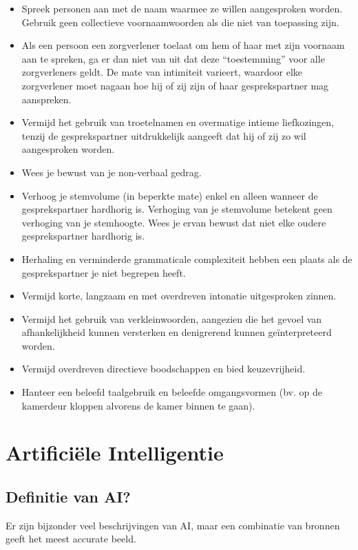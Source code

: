 \begin{itemize}
    \item Spreek personen aan met de naam waarmee ze willen aangesproken worden. Gebruik geen collectieve voornaamwoorden als die niet van toepassing zijn.
    \item Als een persoon een zorgverlener toelaat om hem of haar met zijn voornaam aan te spreken, ga er dan niet van uit dat deze “toestemming” voor alle zorgverleners geldt. De mate van intimiteit varieert, waardoor elke zorgverlener moet nagaan hoe hij of zij zijn of haar gesprekspartner mag aanspreken.
    \item Vermijd het gebruik van troetelnamen en overmatige intieme liefkozingen, tenzij de gesprekspartner uitdrukkelijk aangeeft dat hij of zij zo wil aangesproken worden.
    \item Wees je bewust van je non-verbaal gedrag.
    \item Verhoog je stemvolume (in beperkte mate) enkel en alleen wanneer de gesprekspartner hardhorig is. Verhoging van je stemvolume betekent geen verhoging van je stemhoogte. Wees je ervan bewust dat niet elke oudere gesprekspartner hardhorig is.
    \item Herhaling en verminderde grammaticale complexiteit hebben een plaats als de gesprekspartner je niet begrepen heeft.
    \item Vermijd korte, langzaam en met overdreven intonatie uitgesproken zinnen.
    \item Vermijd het gebruik van verkleinwoorden, aangezien die het gevoel van afhankelijkheid kunnen versterken en denigrerend kunnen geïnterpreteerd worden.
    \item Vermijd overdreven directieve boodschappen en bied keuzevrijheid.
    \item Hanteer een beleefd taalgebruik en beleefde omgangsvormen (bv. op de kamerdeur kloppen alvorens de kamer binnen te gaan).
\end{itemize}

\clearpage

\section{Artificiële Intelligentie}
\subsection{Definitie van AI?}
Er zijn bijzonder veel beschrijvingen van AI, maar een combinatie van bronnen geeft het meest accurate beeld.

